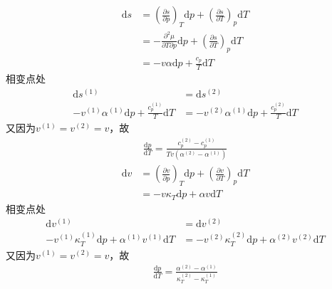 \documentclass{phyasgn}
\renewcommand{\d}{\mathrm{d}}
\begin{document}
\begin{sol}[8]
    \begin{align*}
        \d s&=(\frac{\partial s}{\partial p})_T\d p+(\frac{\partial s}{\partial T})_p\d T\\
        &=-\frac{\partial^2\mu}{\partial T\partial p}\d p+(\frac{\partial s}{\partial T})_p\d T\\
        &=-v\alpha\d p+\frac{c_p}{T}\d T
    \end{align*}
    相变点处
    \begin{align*}
        \d s^{(1)}&=\d s^{(2)}\\
        -v^{(1)}\alpha^{(1)}\d p+\frac{c_p^{(1)}}{T}\d T&=-v^{(2)}\alpha^{(1)}\d p+\frac{c_p^{(2)}}{T}\d T
    \end{align*}
    又因为$v^{(1)}=v^{(2)}=v$，故
    \begin{align*}
        \frac{\d p}{\d T}=\frac{c_p^{(2)}-c^{(1)}_p}{Tv(\alpha^{(2)}-\alpha^{(1)})}
    \end{align*}
    \begin{align*}
        \d v&=(\frac{\partial v}{\partial p})_T\d p+(\frac{\partial v}{\partial T})_p\d T\\
        &=-v\kappa_T\d p+\alpha v\d T
    \end{align*}
    相变点处
    \begin{align*}
        \d v^{(1)}&=\d v^{(2)}\\
        -v^{(1)}\kappa_T^{(1)}\d p+\alpha^{(1)}v^{(1)}\d T&=-v^{(2)}\kappa_T^{(2)}\d p+\alpha^{(2)}v^{(2)}\d T
    \end{align*}
    又因为$v^{(1)}=v^{(2)}=v$，故
    \begin{align*}
        \frac{\d p}{\d T}=\frac{\alpha^{(2)}-\alpha^{(1)}}{\kappa_T^{(2)}-\kappa_T^{(1)}}
    \end{align*}
\end{sol}\par
\end{document}
